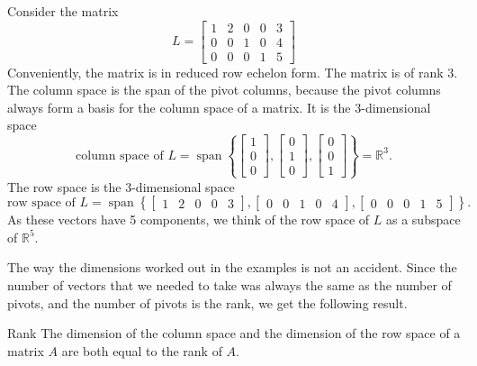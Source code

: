 \begin{example}
Consider the matrix 
\begin{equation*}
L =
\begin{bmatrix}
{1} & 2 & 0 & 0 & 3 \\
0 & 0 & {1} & 0 & 4 \\
0 & 0 & 0 & {1} & 5
\end{bmatrix} 
\end{equation*}
Conveniently, the matrix is in reduced row echelon form.
The matrix is of rank 3.
The column space is the span of the pivot columns, because the pivot columns always form a basis for the column space of a matrix.
It is the 3-dimensional space
\begin{equation*}
\text{column space of $L$} =
\operatorname{span} \left\{
\begin{bmatrix}
1 \\
0 \\
0
\end{bmatrix} 
,
\begin{bmatrix}
0 \\
1 \\
0
\end{bmatrix} 
,
\begin{bmatrix}
0 \\
0 \\
1
\end{bmatrix} 
\right\}
= {\mathbb{R}}^3 .
\end{equation*}
The row space is the 3-dimensional space
\begin{equation*}
\text{row space of $L$} =
\operatorname{span} \left\{
\begin{bmatrix}
1 & 2 & 0 & 0 & 3
\end{bmatrix} 
,
\begin{bmatrix}
0 & 0 & 1 & 0 & 4
\end{bmatrix} 
,
\begin{bmatrix}
0 & 0 & 0 & 1 & 5
\end{bmatrix} 
\right\} .
\end{equation*}
As these vectors have 5 components, we think of the row space of $L$
as a subspace of ${\mathbb{R}}^5$.
\end{example}

The way the dimensions worked out in the examples is not 
an accident.  Since the number of vectors that we needed to take
was always the same as the number of pivots, and the number of pivots
is the rank, we get the following result.

\begin{theorem1}{Rank}
The dimension of the column space and the dimension of the row space 
of a matrix $A$ are both equal to the rank of $A$.
\end{theorem1}



